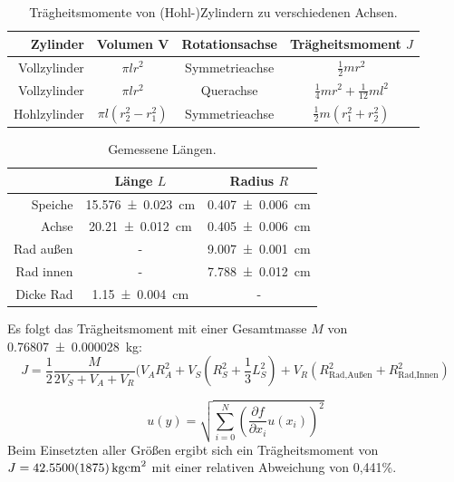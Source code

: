 \documentclass[
	a4paper,
	12pt,
	pagesize,
	ngerman
]{scrartcl}
\begin{document}
	\begin{table}[tb]
		\centering
		\begin{tabular}{ r |  c | c | c}
			Zylinder& Volumen V &Rotationsachse & Trägheitsmoment $J$\\ \hline
			Vollzylinder& $\pi lr^2$ &Symmetrieachse & $\frac{1}{2} m r^2$ \\
			Vollzylinder& $\pi lr^2$&Querachse & $\frac{1}{4} m r^2 + \frac{1}{12} m l^2$ \\
			Hohlzylinder& $\pi l(r_2^2 - r_1^2)$&Symmetrieachse & $\frac{1}{2} m (r_1^2 + r_2^2)$ \\
		\end{tabular}
		\caption{Trägheitsmomente von (Hohl-)Zylindern zu verschiedenen Achsen.}
		\label{Tabelle_Traegheitsmomente_Zylinder} 
	\end{table}

	\begin{table}[tb]
		\centering
		\begin{tabular}{ r |  c | c }
			& Länge $L$ & Radius $R$\\ \hline
			Speiche &\SI{15,576\pm 0,023}{cm} & \SI{0,407\pm0,006}{cm}\\
			Achse & \SI{20,21\pm0,012}{cm} & \SI{0,405\pm0,006}{cm}\\
			Rad außen&- & \SI{9,007\pm0,001}{cm} \\
			Rad innen&- & \SI{7,788\pm0,012}{cm} \\
			Dicke Rad & \SI{1,15\pm0,004}{cm} & -
		\end{tabular}
		\caption{ Gemessene Längen.}
		\label{Tabelle_Laenge} 
	\end{table}
	Es folgt das Trägheitsmoment mit einer Gesamtmasse $M$ von \SI{0,76807 \pm 0,000028}{kg}:
	\begin{equation}
		J = \frac{1}{2}\frac{M}{2V_S+V_A+V_R} ( V_A R_A^2 + V_S (R_S^2 + \frac{1}{3} L_S^2) + V_R (R_\text{Rad,Außen}^2 + R_\text{Rad,Innen}^2)
	\end{equation}

	\begin{equation}
		u(y) = \sqrt{  \sum_{i=0}^{N} \left( \frac{\partial f}{\partial x_i}u(x_i)\right)^2  }
		\label{Partielle_Unsicherheiten}
	\end{equation}
	Beim Einsetzten aller Größen ergibt sich ein Trägheitsmoment von $J = \SI{42.550 \pm 0,1875}{kg cm^2}$ mit einer relativen Abweichung von 0,441\%. %
\end{document}
